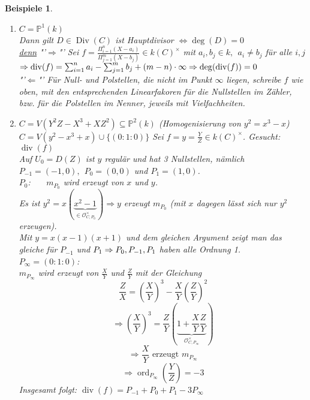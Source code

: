 \documentclass[a4paper,12pt]{report}
\theoremstyle{break}
\newtheorem{Bsp}[Def]{Beispiele}
\theoremstyle{nonumberbreak}
\theoremstyle{nonumberplain}
\DeclareMathOperator{\Div}{Div}
\DeclareMathOperator{\ord}{ord}
\begin{document}
\begin{Bsp}
\label{bsp:19.1}
\begin{enumerate}
\item $C=\mathbb{P}^1(k)$\\
Dann gilt $D\in \Div(C)$ ist Hauptdivisor $\Leftrightarrow \deg(D)=0$\\
\underline{denn} "'$\Rightarrow$"' Sei $f=\frac{\Pi_{i=1}^n(X-a_i)}{\Pi_{j=1}^m(X-b_j)}\in k(C)^{\times}$ mit $a_i,b_j\in k,~~a_i\neq b_j$ für alle $i,j$\\
$\Rightarrow\operatorname{div}(f) = \sum_{i=1}^na_i-\sum_{j=1}^mb_j+(m-n)\cdot \infty\\
\Rightarrow\deg(\operatorname{div}(f))=0$\\
"'$\Leftarrow$"' Für Null- und Polstellen, die nicht im Punkt $\infty$ liegen, schreibe $f$ wie oben, mit den entsprechenden Linearfakoren für die Nullstellen im Zähler, bzw. für die Polstellen im Nenner, jeweils mit Vielfachheiten. 
\item $C=V(Y^2Z-X^3+XZ^2)\subseteq\mathbb{P}^2(k)$ (Homogenisierung von $y^2=x^3-x$)\\
$C=V(y^2-x^3+x)\cup \{(0:1:0)\}$
Sei $f=y=\frac{Y}{Z}\in k(C)^{\times}$. Gesucht: $\operatorname{div}(f)$\\
Auf $U_0=D(Z)$ ist $y$ regulär und hat 3 Nullstellen, nämlich $P_{-1}=(-1,0),~~P_0=(0,0)$ und $P_1=(1,0)$.\\
\underline{$P_0$}:~~~ $m_{P_0}$ wird erzeugt von $x$ und $y$.\\
Es ist $y^2=x(\underbrace{x^2-1}_{\in\mathcal{O}_{C,P_0}^{\times}})\Rightarrow y$ erzeugt $m_{P_0}$ (mit $x$ dagegen lässt sich nur $y^2$ erzeugen).\\
Mit $y=x(x-1)(x+1)$ und dem gleichen Argument zeigt man das gleiche für $P_{-1}$ und $P_1\\
\Rightarrow P_0, P_{-1}, P_1$ haben alle Ordnung 1.\\
\underline{$P_{\infty}=(0:1:0)$}:\\
$m_{P_{\infty}}$ wird erzeugt von $\frac{X}{Y}$ und $\frac{Z}{Y}$ mit der Gleichung
$$\frac{Z}{X}=\left(\frac{X}{Y}\right)^3-\frac{X}{Y}\left(\frac{Z}{Y}\right)^2$$
$$\Rightarrow \left(\frac{X}{Y}\right)^3=\frac{Z}{Y}\left(\underbrace{1+\frac{X}{Y}\frac{Z}{Y}}_{\mathcal{O}_{C,P_{\infty}}^{\times}}\right)$$
$$\Rightarrow \frac{X}{Y} \text{ erzeugt } m_{P_{\infty}}$$
$$\Rightarrow\ord_{P_{\infty}}\left(\frac{Y}{Z}\right)=-3$$
Insgesamt folgt: $\operatorname{div}(f)=P_{-1}+P_0+P_1-3P_{\infty}$
\end{enumerate}
\end{Bsp}
\end{document}
